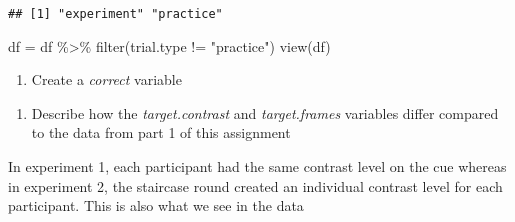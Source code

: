 \documentclass[
]{article}
\newenvironment{Shaded}{\begin{snugshade}}{\end{snugshade}}
\newcommand{\AttributeTok}[1]{\textcolor[rgb]{0.77,0.63,0.00}{#1}}
\newcommand{\DecValTok}[1]{\textcolor[rgb]{0.00,0.00,0.81}{#1}}
\newcommand{\FunctionTok}[1]{\textcolor[rgb]{0.00,0.00,0.00}{#1}}
\newcommand{\NormalTok}[1]{#1}
\newcommand{\OtherTok}[1]{\textcolor[rgb]{0.56,0.35,0.01}{#1}}
\newcommand{\SpecialCharTok}[1]{\textcolor[rgb]{0.00,0.00,0.00}{#1}}
\newcommand{\StringTok}[1]{\textcolor[rgb]{0.31,0.60,0.02}{#1}}
\providecommand{\tightlist}{%
  \setlength{\itemsep}{0pt}\setlength{\parskip}{0pt}}
\begin{document}
\begin{verbatim}
## [1] "experiment" "practice"
\end{verbatim}

\begin{Shaded}
\begin{Highlighting}[]
\NormalTok{df }\OtherTok{=}\NormalTok{ df }\SpecialCharTok{\%\textgreater{}\%} 
  \FunctionTok{filter}\NormalTok{(trial.type }\SpecialCharTok{!=} \StringTok{"practice"}\NormalTok{)}
\FunctionTok{view}\NormalTok{(df)}
\end{Highlighting}
\end{Shaded}

\begin{enumerate}
\def\labelenumi{\roman{enumi}.}
\setcounter{enumi}{2}
\tightlist
\item
  Create a \emph{correct} variable
\end{enumerate}

\begin{Shaded}
\end{Shaded}

\begin{enumerate}
\def\labelenumi{\roman{enumi}.}
\setcounter{enumi}{3}
\tightlist
\item
  Describe how the \emph{target.contrast} and \emph{target.frames}
  variables differ compared to the data from part 1 of this assignment
\end{enumerate}

In experiment 1, each participant had the same contrast level on the cue
whereas in experiment 2, the staircase round created an individual
contrast level for each participant. This is also what we see in the
data
\end{document}
